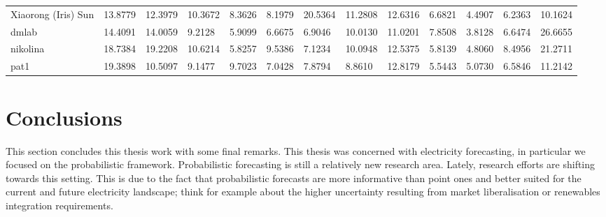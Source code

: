\begin{table}[!ht]
\begin{adjustbox}{width=\textwidth}
\begin{tabular}{lllllllllllll}
  Xiaorong (Iris) Sun        & 13.8779                         & 12.3979                         & 10.3672                         & 8.3626 & 8.1979                         & 20.5364 & 11.2808                         & 12.6316 & 6.6821  & 4.4907                         & 6.2363                         & 10.1624                         \\
  dmlab                      & 14.4091                         & 14.0059                         & 9.2128                          & 5.9099                         & 6.6675                         & 6.9046  & 10.0130                         & 11.0201 & 7.8508  & 3.8128                         & 6.6474                         & 26.6655                         \\
  nikolina                   & 18.7384 & 19.2208                         & 10.6214                         & 5.8257                         & 9.5386                         & 7.1234  & 10.0948                         & 12.5375 & 5.8139  & 4.8060                         & 8.4956                         & 21.2711 \\
  pat1                       & 19.3898                         & 10.5097                         & 9.1477                          & 9.7023                         & 7.0428                         & 7.8794  & 8.8610                          & 12.8179 & 5.5443  & 5.0730                         & 6.5846                         & 11.2142                       
  \end{tabular}
  \end{adjustbox}
  \end{table}







\section{Conclusions}
This section concludes this thesis work with some final remarks.
This thesis was concerned with electricity forecasting, in particular we focused on the probabilistic framework.
Probabilistic forecasting is still a relatively new research area. Lately, research efforts are shifting towards this setting. This is due to the fact that probabilistic forecasts are more informative than point ones and better suited for the current and future electricity landscape; think for example about the higher uncertainty resulting from market liberalisation or renewables integration requirements.

